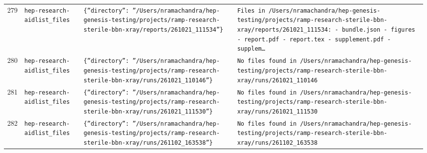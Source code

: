 \documentclass[11pt,a4paper]{article}
\begin{document}
\begin{longtable}{@{}p{}p{}p{}p{}@{}}
279 & \texttt{hep-research-aid}\newline\texttt{list\_\allowbreak{}files} & \texttt{\{''directory'':\allowbreak{} ''/\allowbreak{}Users/\allowbreak{}nramachandra/\allowbreak{}hep-genesis-testing/\allowbreak{}projects/\allowbreak{}ramp-research-sterile-bbn-xray/\allowbreak{}reports/\allowbreak{}261021\_\allowbreak{}111534''\}\allowbreak{}} & \texttt{Files in /\allowbreak{}Users/\allowbreak{}nramachandra/\allowbreak{}hep-genesis-testing/\allowbreak{}projects/\allowbreak{}ramp-research-sterile-bbn-xray/\allowbreak{}reports/\allowbreak{}261021\_\allowbreak{}111534:\allowbreak{}   - bundle.json   - figures   - report.pdf   - report.tex   - supplement.pdf   - supplem\ldots{}\allowbreak{}} \\
280 & \texttt{hep-research-aid}\newline\texttt{list\_\allowbreak{}files} & \texttt{\{''directory'':\allowbreak{} ''/\allowbreak{}Users/\allowbreak{}nramachandra/\allowbreak{}hep-genesis-testing/\allowbreak{}projects/\allowbreak{}ramp-research-sterile-bbn-xray/\allowbreak{}runs/\allowbreak{}261021\_\allowbreak{}110146''\}\allowbreak{}} & \texttt{No files found in /\allowbreak{}Users/\allowbreak{}nramachandra/\allowbreak{}hep-genesis-testing/\allowbreak{}projects/\allowbreak{}ramp-research-sterile-bbn-xray/\allowbreak{}runs/\allowbreak{}261021\_\allowbreak{}110146} \\
281 & \texttt{hep-research-aid}\newline\texttt{list\_\allowbreak{}files} & \texttt{\{''directory'':\allowbreak{} ''/\allowbreak{}Users/\allowbreak{}nramachandra/\allowbreak{}hep-genesis-testing/\allowbreak{}projects/\allowbreak{}ramp-research-sterile-bbn-xray/\allowbreak{}runs/\allowbreak{}261021\_\allowbreak{}111530''\}\allowbreak{}} & \texttt{No files found in /\allowbreak{}Users/\allowbreak{}nramachandra/\allowbreak{}hep-genesis-testing/\allowbreak{}projects/\allowbreak{}ramp-research-sterile-bbn-xray/\allowbreak{}runs/\allowbreak{}261021\_\allowbreak{}111530} \\
282 & \texttt{hep-research-aid}\newline\texttt{list\_\allowbreak{}files} & \texttt{\{''directory'':\allowbreak{} ''/\allowbreak{}Users/\allowbreak{}nramachandra/\allowbreak{}hep-genesis-testing/\allowbreak{}projects/\allowbreak{}ramp-research-sterile-bbn-xray/\allowbreak{}runs/\allowbreak{}261102\_\allowbreak{}163538''\}\allowbreak{}} & \texttt{No files found in /\allowbreak{}Users/\allowbreak{}nramachandra/\allowbreak{}hep-genesis-testing/\allowbreak{}projects/\allowbreak{}ramp-research-sterile-bbn-xray/\allowbreak{}runs/\allowbreak{}261102\_\allowbreak{}163538} \\

\end{longtable}
\end{document}
